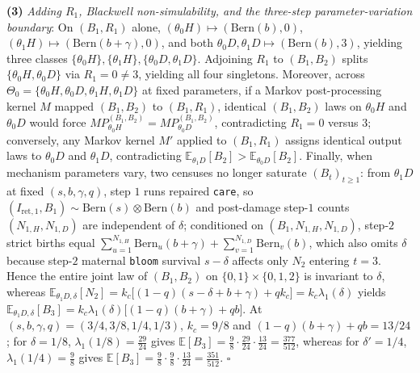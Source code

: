 \documentclass[11pt,a4paper]{article}
\begin{document}
\textbf{(3)} \emph{Adding \(R_1\), Blackwell non-simulability, and the
three-step parameter-variation boundary}: On \((B_1, R_1)\) alone,
\((\theta_0 H) \mapsto (\mathrm{Bern}(b), 0)\),
\((\theta_1 H) \mapsto (\mathrm{Bern}(b+\gamma), 0)\), and both
\(\theta_0 D, \theta_1 D \mapsto (\mathrm{Bern}(b), 3)\), yielding three
classes \(\{\theta_0 H\}, \{\theta_1 H\}, \{\theta_0 D, \theta_1 D\}\).
Adjoining \(R_1\) to \((B_1, B_2)\) splits
\(\{\theta_0 H, \theta_0 D\}\) via \(R_1 = 0 \neq 3\), yielding all four
singletons. Moreover, across
\(\Theta_0 = \{\theta_0 H, \theta_0 D, \theta_1 H, \theta_1 D\}\) at
fixed parameters, if a Markov post-processing kernel \(M\) mapped
\((B_1, B_2)\) to \((B_1, R_1)\), identical \((B_1, B_2)\) laws on
\(\theta_0 H\) and \(\theta_0 D\) would force
\(M P_{\theta_0 H}^{(B_1,B_2)} = M P_{\theta_0 D}^{(B_1,B_2)}\),
contradicting \(R_1 = 0\) versus \(3\); conversely, any Markov kernel
\(M'\) applied to \((B_1, R_1)\) assigns identical output laws to
\(\theta_0 D\) and \(\theta_1 D\), contradicting
\(\mathbb{E}_{\theta_1 D}[B_2] > \mathbb{E}_{\theta_0 D}[B_2]\).
Finally, when mechanism parameters vary, two censuses no longer saturate
\((B_t)_{t \ge 1}\): from \(\theta_1 D\) at fixed \((s, b, \gamma, q)\),
step \(1\) runs repaired \texttt{care}, so
\((I_{\mathrm{ret},1}, B_1) \sim \mathrm{Bern}(s) \otimes \mathrm{Bern}(b)\)
and post-damage step-\(1\) counts \((N_{1,H}, N_{1,D})\) are independent
of \(\delta\); conditioned on \((B_1, N_{1,H}, N_{1,D})\), step-\(2\)
strict births equal
\(\sum_{u=1}^{N_{1,H}} \mathrm{Bern}_u(b+\gamma) + \sum_{v=1}^{N_{1,D}} \mathrm{Bern}_v(b)\),
which also omits \(\delta\) because step-\(2\) maternal \texttt{bloom}
survival \(s - \delta\) affects only \(N_2\) entering \(t=3\). Hence the
entire joint law of \((B_1, B_2)\) on \(\{0,1\} \times \{0,1,2\}\) is
invariant to \(\delta\), whereas
\(\mathbb{E}_{\theta_1 D,\delta}[N_2] = k_c\bigl[(1-q)(s - \delta + b + \gamma) + q k_c\bigr] = k_c \lambda_1(\delta)\)
yields
\(\mathbb{E}_{\theta_1 D,\delta}[B_3] = k_c \lambda_1(\delta)\bigl[(1-q)(b+\gamma) + q b\bigr]\).
At \((s,b,\gamma,q) = (3/4, 3/8, 1/4, 1/3)\), \(k_c = 9/8\) and
\((1-q)(b+\gamma) + q b = 13/24\); for \(\delta = 1/8\),
\(\lambda_1(1/8) = \frac{29}{24}\) gives
\(\mathbb{E}[B_3] = \frac{9}{8}\cdot\frac{29}{24}\cdot\frac{13}{24} = \frac{377}{512}\),
whereas for \(\delta' = 1/4\), \(\lambda_1(1/4) = \frac{9}{8}\) gives
\(\mathbb{E}[B_3] = \frac{9}{8}\cdot\frac{9}{8}\cdot\frac{13}{24} = \frac{351}{512}\).
\(\square\)
\end{document}
